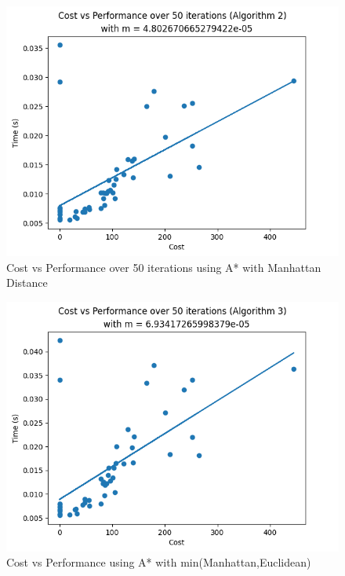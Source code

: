 \documentclass[a4paper]{article}
\begin{document}
\newpage
\begin{figure}[ht]
    \centering
    \includegraphics[width=\textwidth]{CVPALG2.png}
    \caption{ Cost vs Performance over 50 iterations using A* with Manhattan Distance}
    \label{fig:CostVsPerformanceAlg2}
\end{figure}
\newpage
\begin{figure}[ht]
    \centering
    \includegraphics[width=\textwidth]{CVPALG3.png}
    \caption{Cost vs Performance using A* with min(Manhattan,Euclidean)}
    \label{fig:CostVsPerformanceAlg3}
\end{figure}
\newpage
\end{document}

